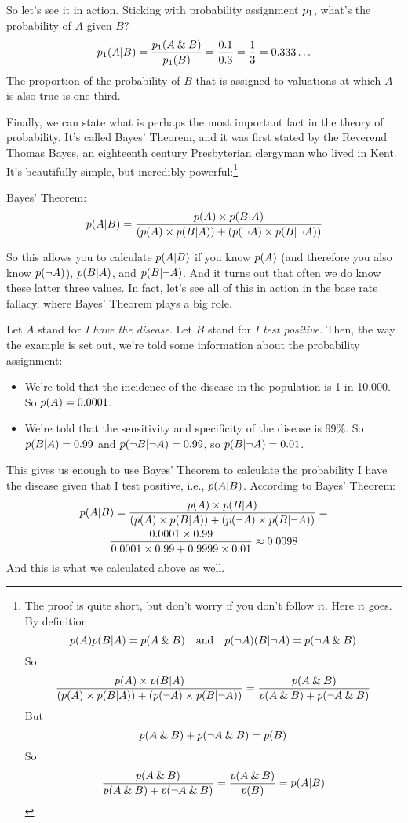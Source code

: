 So let's see it in action. Sticking with probability assignment $p_1$, what's the probability of $A$ given $B$?
\[
p_1(A | B) = \frac{p_1(A\mathbin{\&} B)}{p_1(B)} = \frac{0.1}{0.3} = \frac{1}{3} = 0.333\ldots
\]
The proportion of the probability of $B$ that is assigned to valuations at which $A$ is also true is one-third.

Finally, we can state what is perhaps the most important fact in the theory of probability. It's called Bayes' Theorem, and it was first stated by the Reverend Thomas Bayes, an eighteenth century Presbyterian clergyman who lived in Kent. It's beautifully simple, but incredibly powerful:\footnote{The proof is quite short, but don't worry if you don't follow it. Here it goes. By definition 
\[
p(A) p(B|A) = p(A\mathbin{\&} B) \mbox{\ \ \ and\ \ \ } p(\neg A)(B | \neg A) = p(\neg A\mathbin{\&} B)
\]
So
\[
\frac{p(A) \times p(B|A)}{(p(A) \times p(B|A)) + (p(\neg A)\times p(B|\neg A))} = \frac{p(A\mathbin{\&} B)}{p(A\mathbin{\&} B) + p(\neg A\mathbin{\&} B)}
\]
But
\[
p(A\mathbin{\&} B) + p(\neg A\mathbin{\&} B) = p(B)
\]
So
\[
\frac{p(A\mathbin{\&} B)}{p(A\mathbin{\&} B) + p(\neg A\mathbin{\&} B)} = \frac{p(A\mathbin{\&} B)}{p(B)} = p(A|B)
\]
}
\begin{highlighted}
Bayes' Theorem:
\[
p(A | B) = \frac{p(A) \times p(B|A)}{(p(A) \times p(B|A)) + (p(\neg A)\times p(B|\neg A))}
\]
\end{highlighted}
So this allows you to calculate $p(A|B)$ if you know $p(A)$ (and therefore you also know $p(\neg A)$), $p(B|A)$, and $p(B | \neg A)$. And it turns out that often we do know these latter three values. In fact, let's see all of this in action in the base rate fallacy, where Bayes' Theorem plays a big role.

Let $A$ stand for \emph{I have the disease}. Let $B$ stand for \emph{I test positive}. Then, the way the example is set out, we're told some information about the probability assignment:
\begin{itemize}
\item We're told that the incidence of the disease in the population is 1 in 10,000. So $p(A) = 0.0001$.
\item We're told that the sensitivity and specificity of the disease is 99\%. So $p(B | A) = 0.99$ and $p(\neg B | \neg A) = 0.99$, so $p(B | \neg A) = 0.01$.
\end{itemize}
This gives us enough to use Bayes' Theorem to calculate the probability I have the disease given that I test positive, i.e., $p(A | B)$. According to Bayes' Theorem:
\begin{multline*}
p(A | B) = \frac{p(A) \times p(B|A)}{(p(A) \times p(B|A)) + (p(\neg A)\times p(B|\neg A))} = \\ \frac{0.0001 \times 0.99}{0.0001 \times 0.99 + 0.9999 \times 0.01} \approx 0.0098
\end{multline*}
And this is what we calculated above as well.

